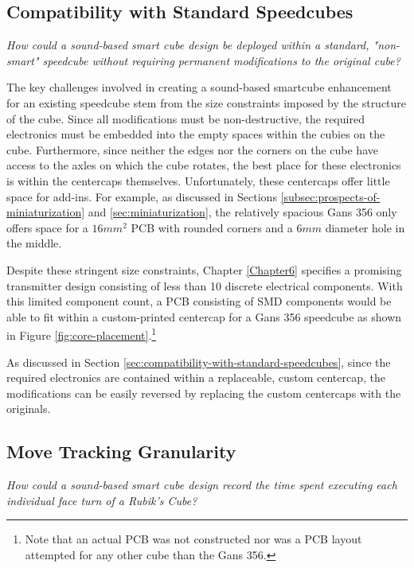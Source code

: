 \subsection{Compatibility with Standard Speedcubes}
\label{subsec:answer-compatibility}

\emph{How could a sound-based smart cube design be deployed within a
standard, "non-smart" speedcube without requiring permanent
modifications to the original cube?}

The key challenges involved in creating a sound-based smartcube
enhancement for an existing speedcube stem from the size constraints
imposed by the structure of the cube. Since all modifications must be
non-destructive, the required electronics must be embedded into the
empty spaces within the cubies on the cube. Furthermore, since neither
the edges nor the corners on the cube have access to the axles on which
the cube rotates, the best place for these electronics is within the
centercaps themselves. Unfortunately, these centercaps offer little
space for add-ins. For example, as discussed in Sections
\ref{subsec:prospects-of-miniaturization} and
\ref{sec:miniaturization}, the relatively spacious Gans 356 only offers
space for a $16mm^2$ PCB with rounded corners and a $6mm$ diameter hole
in the middle.

Despite these stringent size constraints, Chapter \ref{Chapter6}
specifies a promising transmitter design consisting of less than 10
discrete electrical components. With this limited component count, a
PCB consisting of SMD components would be able to fit within a
custom-printed centercap for a Gans 356 speedcube as shown in Figure
\ref{fig:core-placement}.\footnote{Note that an actual PCB was not
constructed nor was a PCB layout attempted for any other cube than the
Gans 356.}

As discussed in Section
\ref{sec:compatibility-with-standard-speedcubes}, since the required
electronics are contained within a replaceable, custom centercap, the
modifications can be easily reversed by replacing the custom centercaps
with the originals.


\subsection{Move Tracking Granularity}
\label{subsec:answer-granularity}

\emph{How could a sound-based smart cube design record the time spent
executing each individual face turn of a Rubik's Cube?}

